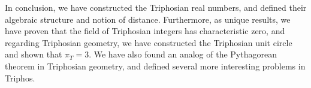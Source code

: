 \documentclass[11pt]{article}
\theoremstyle{definition}
\theoremstyle{plain}
\theoremstyle{remark}
\begin{document}
	In conclusion, we have constructed the Triphosian real numbers, and defined
	their algebraic structure and notion of distance. Furthermore, as unique
	results, we have proven that the field of Triphosian integers has
	characteristic zero, and regarding Triphosian geometry, we have constructed
	the Triphosian unit circle and shown that \(\pi_T = 3\). We have also found
	an analog of the Pythagorean theorem in Triphosian geometry, and defined
	several more interesting problems in Triphos.

	
	
\end{document}
